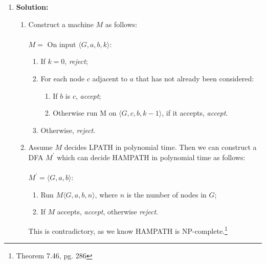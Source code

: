 \documentclass{article}
\begin{document}
\begin{enumerate}
    \item \textbf{Solution:}
        \begin{enumerate}
            \item Construct a machine $M$ as follows: \\ \\
            $M = $ On input $\langle G, a, b, k \rangle$:
                \begin{enumerate}
                    \item If $k=0$, \emph{reject};
                    \item For each node $c$ adjacent to $a$ that has not already been considered:
                    \begin{enumerate}
                        \item If $b$ is $c$, \emph{accept};
                        \item Otherwise run M on $\langle G, c, b, k-1 \rangle$, if it accepts, \emph{accept}.
                    \end{enumerate}
                    \item Otherwise, \emph{reject}.
                \end{enumerate}
            \item Assume $M$ decides LPATH in polynomial time. Then we can construct a DFA $M^{\prime}$ which can decide HAMPATH in polynomial time as follows: \\ \\
            $M^{\prime} = \langle G, a, b \rangle$:
            \begin{enumerate}
                \item Run $M\langle G, a, b, n \rangle$, where $n$ is the number of nodes in $G$;
                \item If $M$ accepts, \emph{accept}, otherwise \emph{reject}.
            \end{enumerate}
            This is contradictory, as we know HAMPATH is NP-complete.\footnote{Theorem 7.46, pg. 286}
        \end{enumerate}
\end{enumerate}
\end{document}
